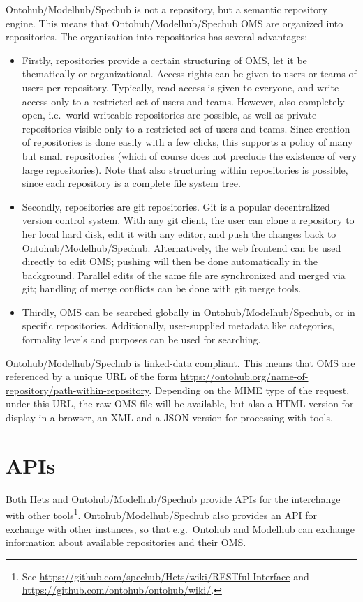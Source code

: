 \documentclass[10pt,fleqn,final]{scrreprt}
\newcommand{\sclause}[1]{\section{#1}}
\begin{document}
Ontohub/Modelhub/Spechub is not a repository, but a semantic repository engine. This
means that Ontohub/Modelhub/Spechub OMS are organized into repositories.
The
organization into repositories has several advantages:
\begin{itemize}
\item
 Firstly, repositories provide a certain structuring of OMS,
 let it be thematically or organizational. Access rights can be given
 to users or teams of users per repository. Typically, read access is
 given to everyone, and write access only to a restricted set of users
 and teams. However, also completely open, i.e.\ world-writeable repositories
 are possible, as well as private repositories visible only to a
 restricted set of users and teams.  Since creation of repositories is
 done easily with a few clicks, this supports a policy of many but
 small repositories (which of course does not preclude the existence
 of very large repositories). Note that also structuring within
 repositories is possible, since each repository is a complete file
 system tree.
 
\item
 Secondly, repositories are git repositories. Git is a popular
 decentralized version control system. With any git client, the user
 can clone a repository to her local hard disk, edit it
 with any editor, and push the changes back to Ontohub/Modelhub/Spechub. Alternatively,
 the web frontend can be used directly to edit OMS; pushing
 will then be done automatically in the background. Parallel edits of
 the same file are synchronized and merged via git; handling of
 merge conflicts can be done with git merge tools.
\item
Thirdly, OMS can be searched globally in Ontohub/Modelhub/Spechub, or in
specific repositories. Additionally, user-supplied metadata like
categories, formality levels and purposes can be used for searching.
\end{itemize}

Ontohub/Modelhub/Spechub is linked-data compliant. This means that OMS are
referenced by a unique URL of the form
\url{https://ontohub.org/name-of-repository/path-within-repository}. Depending
on the MIME type of the request, under this URL, the raw OMS file
will be available, but also a HTML version for display in a browser, 
an XML and a JSON version for processing with tools.

\sclause{APIs}\label{c:APIs}

Both Hets and Ontohub/Modelhub/Spechub provide APIs for the interchange
with other tools\footnote{See \url{https://github.com/spechub/Hets/wiki/RESTful-Interface} and \url{https://github.com/ontohub/ontohub/wiki/}.}. Ontohub/Modelhub/Spechub also provides an API for
exchange with other instances, so that e.g.\ Ontohub and Modelhub
can exchange information about available repositories and their OMS.
\end{document}
